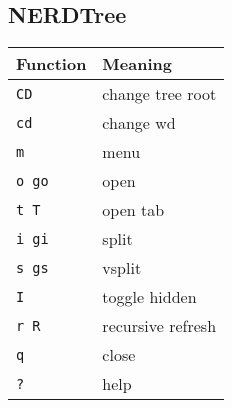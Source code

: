 \documentclass[a4paper]{article}
\begin{document}
\begin{minipage}[t]{0.33\textwidth}
  \subsection*{NERDTree}
 \begin{tabular}{l l}
    \toprule
    Function      & Meaning           \\
    \midrule
    \texttt{CD}   & change tree root  \\
    \texttt{cd}   & change wd         \\
    \texttt{m}    & menu              \\
    \texttt{o go} & open              \\
    \texttt{t T}  & open tab          \\
    \texttt{i gi} & split             \\
    \texttt{s gs} & vsplit            \\
    \texttt{I}    & toggle hidden     \\
    \texttt{r R}  & recursive refresh \\
    \texttt{q}    & close             \\
    \texttt{?}    & help              \\
    \bottomrule
  \end{tabular}
\end{minipage}
\end{document}
